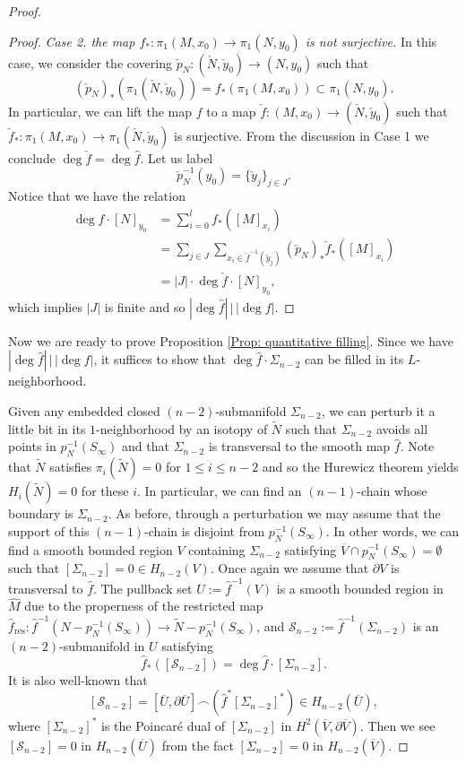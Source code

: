 \documentclass[11pt,letterpaper]{amsart}
\numberwithin{equation}{section}
\theoremstyle{definition}
\begin{document}
\begin{proof}
\begin{proof}
\medskip
{\it Case 2. the map $f_*:\pi_1(M,x_0)\to \pi_1(N,y_0)$ is not surjective.} In this case, we consider the covering $\check p_N:(\check N, \check y_0) \to (N,y_0)$ such that
$$
(\check p_N)_*(\pi_1(\check N,\check y_0))=f_*(\pi_1(M,x_0))\subset \pi_1(N,y_0).
$$
In particular, we can lift the map $f$ to a map $\check f:(M,x_0)\to (\check N,\check y_0)$ such that $\check{f}_{*}:\pi_{1}(M,x_{0})\to\pi_{1}(\check{N},\check{y}_{0})$ is surjective. From the discussion in Case 1 we conclude $\deg \check f=\deg \hat f$. Let us label
$$
\check p_N^{-1}(y_0)=\{\check y_j\}_{j\in J}.
$$
Notice that we have the relation
\[
\begin{split}
\deg f\cdot [N]_{y_0}&=\sum_{i=0}^l f_*([M]_{x_i})\\
&=\sum_{j\in J}\sum_{x_i\in \check f^{-1}(\check y_j)}{(\check{p}_N)_*}\check f_*([M]_{x_i})\\
&=|J|\cdot \deg \check f\cdot [N]_{y_0},
\end{split}
\]
which implies $|J|$ is finite and so $|\deg\hat f|\,\big |\,|\deg f|$.
\end{proof}

Now we are ready to prove Proposition \ref{Prop: quantitative filling}. Since we have $|\deg\hat f|\,\big|\,|\deg f|$, it suffices to show that $\deg\hat f\cdot \Sigma_{n-2}$ can be filled in its $L$-neighborhood.

Given any embedded closed $(n-2)$-submanifold $\Sigma_{n-2}$, we can perturb it a little bit in its $1$-neighborhood by an isotopy of $\tilde N$ such that $\Sigma_{n-2}$ avoids all points in $p_N^{-1}(S_\infty)$ and that $\Sigma_{n-2}$ is transversal to the smooth map $\hat f$. Note that $\tilde N$ satisfies $\pi_i(\tilde N)=0$ for $1\leq i\leq n-2$ and so the Hurewicz theorem yields $H_i(\tilde N)=0$ for these $i$. In particular, we can find an $(n-1)$-chain whose boundary is $\Sigma_{n-2}$. As before, through a perturbation we may assume that the support of this $(n-1)$-chain is disjoint from $p_N^{-1}(S_\infty)$. In other words, we can find a smooth bounded region $V$ containing $\Sigma_{n-2}$ satisfying $\overline V\cap p_N^{-1}(S_\infty)=\emptyset$ such that $[\Sigma_{n-2}]=0\in H_{n-2}(V)$. Once again we assume that $\partial V$ is transversal to $\hat f$.
The pullback set $U:=\hat f^{-1}(V)$ is a smooth bounded region in $\widehat M$ due to the properness of the restricted map  $\hat f_{\mathrm{res}}:\hat f^{-1}(N-p_N^{-1}(S_\infty))\to \tilde N-p_N^{-1}(S_\infty)$, and $\mathcal S_{n-2}:=\hat f^{-1}(\Sigma_{n-2})$ is an $(n-2)$-submanifold in $U$ satisfying
$$
\hat f_*([\mathcal S_{n-2}])=\deg \hat f\cdot [\Sigma_{n-2}].
$$
It is also well-known that
$$
[\mathcal S_{n-2}]=[\overline U,\partial\overline U]\frown(\hat f^*[\Sigma_{n-2}]^*)\in H_{n-2}(\overline U),
$$
where $[\Sigma_{n-2}]^*$ is the Poincar\'e dual of $[\Sigma_{n-2}]$ in $H^2(\overline V,\partial \overline V)$. Then we see $[\mathcal S_{n-2}]=0$ in $H_{n-2}(\overline U)$ from the fact $[\Sigma_{n-2}]=0$ in $H_{n-2}(\overline V)$.


\end{proof}
\end{document}
